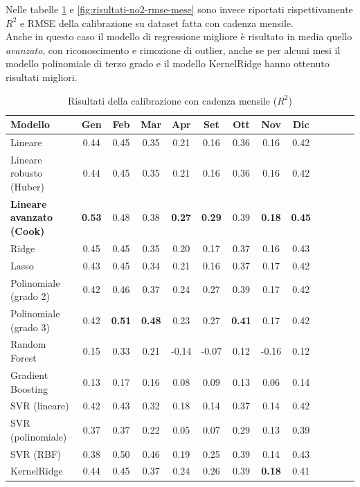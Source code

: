 Nelle tabelle \ref{fig:risultati-no2-mese} e \ref{fig:risultati-no2-rmse-mese} sono invece riportati rispettivamente $R^2$ e RMSE della calibrazione su dataset  fatta con cadenza mensile.\\

Anche in questo caso il modello di regressione migliore è risultato in media quello \textit{avanzato}, con riconoscimento e rimozione di outlier, anche se per alcuni mesi il modello polinomiale di terzo grado e il modello KernelRidge hanno ottenuto risultati migliori.

\begin{table}[H]
    \footnotesize
    \centering
    \def\arraystretch{0.95}
    \begin{tabular}{|l|c|c|c|c|c|c|c|c|c|c|c|c|}
    \hline
        \textbf{Modello} & \textbf{Gen} & \textbf{Feb} & \textbf{Mar} & \textbf{Apr} & \textbf{Set} & \textbf{Ott} & \textbf{Nov} & \textbf{Dic} \\ \hline
        Lineare & 0.44 & 0.45 & 0.35 & 0.21 & 0.16 & 0.36 & 0.16 & 0.42 \\ \hline
        Lineare robusto (Huber) & 0.44 & 0.45 & 0.35 & 0.21 & 0.16 & 0.36 & 0.16 & 0.42 \\ \hline
        \textbf{Lineare avanzato (Cook)} & \textbf{0.53} & 0.48 & 0.38 & \textbf{0.27} & \textbf{0.29} & 0.39 & \textbf{0.18} & \textbf{0.45} \\ \hline
        Ridge & 0.45 & 0.45 & 0.35 & 0.20 & 0.17 & 0.37 & 0.16 & 0.43 \\ \hline
        Lasso & 0.43 & 0.45 & 0.34 & 0.21 & 0.16 & 0.37 & 0.17 & 0.42 \\ \hline
        Polinomiale (grado 2) & 0.42 & 0.46 & 0.37 & 0.24 & 0.27 & 0.39 & 0.17 & 0.42 \\ \hline
        Polinomiale (grado 3) & 0.42 & \textbf{0.51} & \textbf{0.48} & 0.23 & 0.27 & \textbf{0.41} & 0.17 & 0.42 \\ \hline
        Random Forest & 0.15 & 0.33 & 0.21 & -0.14 & -0.07 & 0.12 & -0.16 & 0.12 \\ \hline
        Gradient Boosting & 0.13 & 0.17 & 0.16 & 0.08 & 0.09 & 0.13 & 0.06 & 0.14 \\ \hline
        SVR (lineare) & 0.42 & 0.43 & 0.32 & 0.18 & 0.14 & 0.37 & 0.14 & 0.42 \\ \hline
        SVR (polinomiale) & 0.37 & 0.37 & 0.22 & 0.05 & 0.07 & 0.29 & 0.13 & 0.39 \\ \hline
        SVR (RBF) & 0.38 & 0.50 & 0.46 & 0.19 & 0.25 & 0.39 & 0.14 & 0.43 \\ \hline
        KernelRidge & 0.44 & 0.45 & 0.37 & 0.24 & 0.26 & 0.39 & \textbf{0.18} & 0.41 \\ \hline
    \end{tabular}
    \captionsetup{justification=centering}
    \caption{Risultati della calibrazione  con cadenza mensile ($R^2$)}
    \label{fig:risultati-no2-mese}
\end{table}

